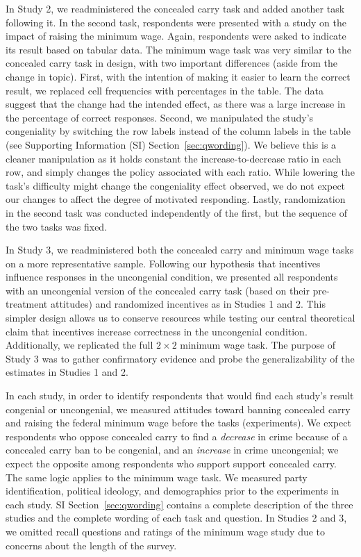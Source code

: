 \documentclass[12pt, letterpaper]{article}
\begin{document}
In Study 2, we readministered the concealed carry task and added another task following it. In the second task, respondents were presented with a study on the impact of raising the minimum wage. Again, respondents were asked to indicate its result based on tabular data. The minimum wage task was very similar to the concealed carry task in design, with two important differences (aside from the change in topic). First, with the intention of making it easier to learn the correct result, we replaced cell frequencies with percentages in the table. The data suggest that the change had the intended effect, as there was a large increase in the percentage of correct responses. Second, we manipulated the study's congeniality by switching the row labels instead of the column labels in the table (see Supporting Information (SI) Section~\ref{sec:qwording}). We believe this is a cleaner manipulation as it holds constant the increase-to-decrease ratio in each row, and simply changes the policy associated with each ratio. While lowering the task's difficulty might change the congeniality effect observed, we do not expect our changes to affect the degree of motivated responding. Lastly, randomization in the second task was conducted independently of the first, but the sequence of the two tasks was fixed.

In Study 3, we readministered both the concealed carry and minimum wage tasks on a more representative sample. Following our hypothesis that incentives influence responses in the uncongenial condition, we presented all respondents with an uncongenial version of the concealed carry task (based on their pre-treatment attitudes) and randomized incentives as in Studies 1 and 2. This simpler design allows us to conserve resources while testing our central theoretical claim that incentives increase correctness in the uncongenial condition. Additionally, we replicated the full $2 \times 2$ minimum wage task. The purpose of Study 3 was to gather confirmatory evidence and probe the generalizability of the estimates in Studies 1 and 2.

In each study, in order to identify respondents that would find each study's result congenial or uncongenial, we measured attitudes toward banning concealed carry and raising the federal minimum wage before the tasks (experiments). We expect respondents who oppose concealed carry to find a {\it decrease} in crime because of a concealed carry ban to be congenial, and an {\it increase} in crime uncongenial; we expect the opposite among respondents who support support concealed carry. The same logic applies to the minimum wage task. We measured party identification, political ideology, and demographics prior to the experiments in each study. SI Section~\ref{sec:qwording} contains a complete description of the three studies and the complete wording of each task and question. In Studies 2 and 3, we omitted recall questions and ratings of the minimum wage study due to concerns about the length of the survey.
\end{document}
